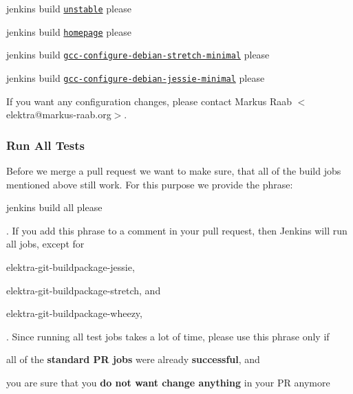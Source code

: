 \begin{DoxyItemize}
\item jenkins build \href{https://build.libelektra.org/job/elektra-mergerequests-unstable/}{\tt unstable} please
\item jenkins build \href{https://build.libelektra.org/job/elektra-homepage/}{\tt homepage} please
\item jenkins build \href{https://build.libelektra.org/job/elektra-gcc-configure-debian-stretch-minimal/}{\tt gcc-\/configure-\/debian-\/stretch-\/minimal} please
\item jenkins build \href{https://build.libelektra.org/job/elektra-gcc-configure-debian-jessie-minimal/}{\tt gcc-\/configure-\/debian-\/jessie-\/minimal} please
\end{DoxyItemize}

If you want any configuration changes, please contact {\ttfamily Markus Raab $<$elektra@markus-\/raab.\+org$>$}.

\subsubsection*{Run All Tests}

Before we merge a pull request we want to make sure, that all of the build jobs mentioned above still work. For this purpose we provide the phrase\+:


\begin{DoxyCode}
jenkins build all please
\end{DoxyCode}


. If you add this phrase to a comment in your pull request, then Jenkins will run all jobs, except for


\begin{DoxyItemize}
\item {\ttfamily elektra-\/git-\/buildpackage-\/jessie},
\item {\ttfamily elektra-\/git-\/buildpackage-\/stretch}, and
\item {\ttfamily elektra-\/git-\/buildpackage-\/wheezy},
\end{DoxyItemize}

. Since running all test jobs takes a lot of time, please use this phrase only if


\begin{DoxyItemize}
\item all of the {\bfseries standard PR jobs} were already {\bfseries successful}, and
\item you are sure that you {\bfseries do not want change anything} in your PR anymore
\end{DoxyItemize}